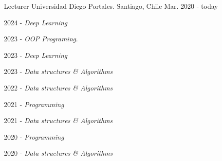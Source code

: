 

\begin{cventries}

  \cventry
    {Lecturer} %
    {Universidad Diego Portales.} %
    {Santiago, Chile} %
    {Mar. 2020 - today} %
    {
      \begin{cvitems} %
        \item 2024 - \emph{Deep Learning}
        \item 2023 - \emph{OOP Programing}.
        \item 2023 - \emph{Deep Learning}
        \item 2023 - \emph{Data structures \& Algorithms}
        \item 2022 - \emph{Data structures \& Algorithms}
        \item 2021 - \emph{Programming}
        \item 2021 - \emph{Data structures \& Algorithms}
        \item 2020 - \emph{Programming}
        \item 2020 - \emph{Data structures \& Algorithms}
      \end{cvitems}
    }

\end{cventries}
